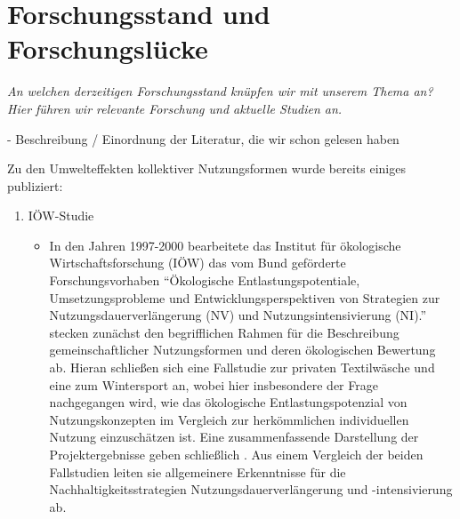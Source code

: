 \documentclass[11pt, titlepage=true]{scrartcl} %
\newcommand{\was}[1]{\small\textit{#1}}
\begin{document}
\section{Forschungsstand und Forschungslücke}\label{sec:forschung}
\was{An welchen derzeitigen Forschungsstand knüpfen wir mit unserem Thema an? Hier führen wir relevante Forschung und aktuelle Studien an.}

- Beschreibung / Einordnung der Literatur, die wir schon gelesen haben

Zu den Umwelteffekten kollektiver Nutzungsformen wurde bereits einiges
publiziert: 
\begin{enumerate}
     \item IÖW-Studie
       \begin{itemize}
         \item In den Jahren 1997-2000 bearbeitete das Institut für ökologische
           Wirtschaftsforschung (IÖW) das vom Bund geförderte
           Forschungsvorhaben \enquote{Ökologische Entlastungspotentiale,
             Umsetzungsprobleme und Entwicklungsperspektiven von Strategien zur
             Nutzungsdauerverlängerung (NV) und Nutzungsintensivierung (NI).}
             \textcite{scholl_produkte_1998} stecken zunächst den
             begrifflichen Rahmen für die Beschreibung gemeinschaftlicher
             Nutzungsformen und deren ökologischen Bewertung ab. Hieran
             schließen sich eine Fallstudie zur privaten Textilwäsche
             \parencite{hirschl_produkte_2000} und eine zum Wintersport
             \parencite{konrad_produkte_2000} an, wobei hier insbesondere der
             Frage nachgegangen wird, wie das ökologische Entlastungspotenzial
             von Nutzungskonzepten im Vergleich zur herkömmlichen individuellen
             Nutzung einzuschätzen ist. Eine zusammenfassende Darstellung der
             Projektergebnisse geben schließlich
             \textcite{hirschl_nachhaltige_2001}. Aus einem Vergleich der beiden
             Fallstudien leiten sie allgemeinere Erkenntnisse für die
             Nachhaltigkeitsstrategien Nutzungsdauerverlängerung und
             -intensivierung ab.
       \end{itemize}


\end{enumerate}
\end{document}
